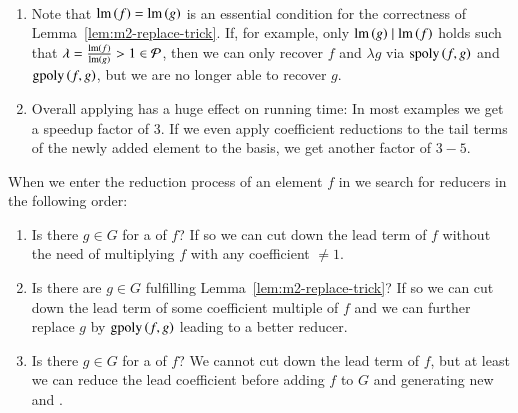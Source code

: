 \begin{remark} \
\begin{enumerate}
\item Note that $\operatorname{lm}\left({f}\right) = \operatorname{lm}\left({g}\right)$ is an essential condition for the correctness of
Lemma~\ref{lem:m2-replace-trick}. If, for example, only $\operatorname{lm}\left({g}\right) \mid \operatorname{lm}\left({f}\right)$
holds such that $\lambda = \frac{\operatorname{lm}\left({f}\right)}{\operatorname{lm}\left({g}\right)} > 1 \in \mathcal{P}$, then we can only
recover $f$ and $\lambda g$ via $\mathrm{spoly}\left({f},{g}\right)$ and $\mathrm{gpoly}\left({f},{g}\right)$, but we are no
longer able to recover $g$.
\item  Overall applying \lcrs has a huge effect on running time: In most examples we
    get a speedup factor of $3$. If we even apply coefficient reductions to the
    tail terms of the newly added element to the basis, we get another factor of
    $3-5$.
\end{enumerate}
\end{remark}

When we enter the reduction process of an element $f$ in \sbba we search for
reducers in the following order:
\begin{enumerate}
\item Is there $g \in G$ for a \ltr of $f$? If so we can cut down the lead
term of $f$ without the need of multiplying $f$ with any coefficient $\neq 1$.
\item Is there are $g \in G$ fulfilling Lemma~\ref{lem:m2-replace-trick}? If so
we can cut down the lead term of some coefficient multiple of $f$ and we can
further replace $g$ by $\mathrm{gpoly}\left({f},{g}\right)$ leading to a better reducer.
\item Is there $g \in G$ for a \lcr of $f$? We cannot cut down the lead term of
$f$, but at least we can reduce the lead coefficient before adding $f$ to $G$
and generating new \spts and \gpts.
\end{enumerate}


